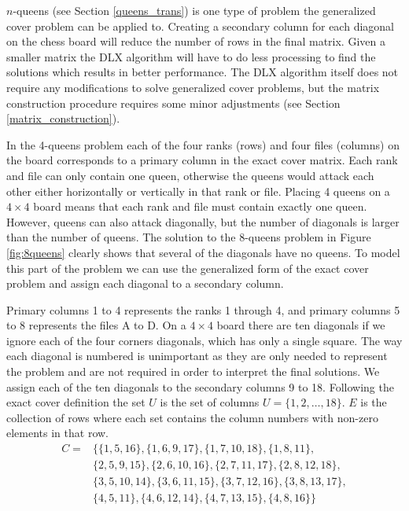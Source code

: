 $n$-queens (see Section \ref{queens_trans}) is one type of problem the generalized cover problem can be applied to.
Creating a secondary column for each diagonal on the chess board will reduce the number of rows in the final matrix.
Given a smaller matrix the DLX algorithm will have to do less processing to find the solutions which results in better performance.
The DLX algorithm itself does not require any modifications to solve generalized cover problems, but the matrix construction procedure requires some minor adjustments (see Section \ref{matrix_construction}).

\begin{example}
In the 4-queens problem each of the four ranks (rows) and four files (columns) on the board corresponds to a primary column in the exact cover matrix.
Each rank and file can only contain one queen, otherwise the queens would attack each other either horizontally or vertically in that rank or file.
Placing 4 queens on a $4 \times 4$ board means that each rank and file must contain exactly one queen.
However, queens can also attack diagonally, but the number of diagonals is larger than the number of queens.
The solution to the 8-queens problem in Figure \ref{fig:8queens} clearly shows that several of the diagonals have no queens.
To model this part of the problem we can use the generalized form of the exact cover problem and assign each diagonal to a secondary column.

Primary columns 1 to 4 represents the ranks 1 through 4, and primary columns 5 to 8 represents the files A to D.
On a $4 \times 4$ board there are ten diagonals if we ignore each of the four corners diagonals, which has only a single square.
The way each diagonal is numbered is unimportant as they are only needed to represent the problem and are not required in order to interpret the final solutions.
We assign each of the ten diagonals to the secondary columns 9 to 18.
Following the exact cover definition the set $U$ is the set of columns $U = \{ 1, 2, \ldots, 18 \}$.
$E$ is the collection of rows where each set contains the column numbers with non-zero elements in that row.
\begin{align*}
C =& \{ \{ 1, 5, 16 \}, \{ 1, 6, 9, 17 \}, \{ 1, 7, 10, 18 \}, \{ 1, 8, 11 \}, \\
&\{ 2, 5, 9, 15 \}, \{ 2, 6, 10, 16 \}, \{ 2, 7, 11, 17 \}, \{ 2, 8, 12, 18 \}, \\
&\{ 3, 5, 10, 14 \}, \{ 3, 6, 11, 15 \}, \{ 3, 7, 12, 16 \}, \{ 3, 8, 13, 17 \}, \\
&\{ 4, 5, 11 \}, \{ 4, 6, 12, 14 \}, \{ 4, 7, 13, 15 \}, \{ 4, 8, 16 \} \}
\end{align*}


\end{example}
